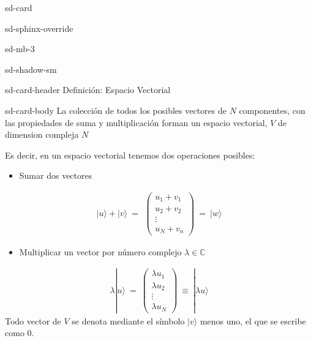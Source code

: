 \documentclass[letterpaper,10pt,english]{jupyterBook}
\newcommand{\ket}[1]{|#1\rangle}
\newcommand{\V}{{ V}}
\begin{document}
\begin{sphinxuseclass}{sd-card}
\begin{sphinxuseclass}{sd-sphinx-override}
\begin{sphinxuseclass}{sd-mb-3}
\begin{sphinxuseclass}{sd-shadow-sm}
\begin{sphinxuseclass}{sd-card-header}
\sphinxAtStartPar
Definición: Espacio Vectorial

\end{sphinxuseclass}
\begin{sphinxuseclass}{sd-card-body}
\sphinxAtStartPar
La colección de todos los posibles vectores de \(N\) componentes,  con las  propiedades de suma y multiplicación forman un espacio vectorial, \(\V\) de dimension compleja \(N\)

\end{sphinxuseclass}
\end{sphinxuseclass}
\end{sphinxuseclass}
\end{sphinxuseclass}
\end{sphinxuseclass}
\sphinxAtStartPar
Es decir,  en un espacio vectorial  tenemos dos operaciones posibles:
\begin{itemize}
\item {} 
\sphinxAtStartPar
Sumar dos vectores

\end{itemize}
\begin{equation*}
\begin{split}
 |u\rangle + \ket{v}~ =~\, 
\begin{pmatrix} {u_1}+v_1\\ {u_2}+v_2\\ \vdots \\ {u_N}+v_n \end{pmatrix} ~= ~\ket{w}
\end{split}
\end{equation*}\begin{itemize}
\item {} 
\sphinxAtStartPar
Multiplicar un vector por número complejo \(\lambda\in {\mathbb C}\)

\end{itemize}
\begin{equation*}
\begin{split}
 \lambda|u\rangle ~ =~   \begin{pmatrix} {\lambda u_1}\\ {\lambda u_2}\\ \vdots \\ {\lambda u_N} \end{pmatrix} ~\equiv~\ket{\lambda u}
\end{split}
\end{equation*}
\sphinxAtStartPar
Todo vector de \(V\) se denota mediante el símbolo \(\ket{v}\) menos uno, el  que se escribe como \(0\).
\end{document}
